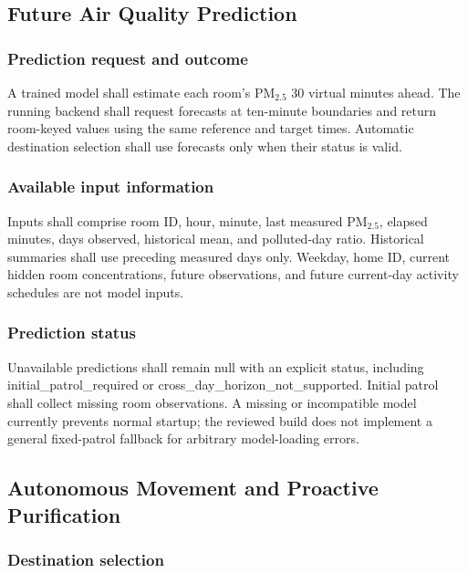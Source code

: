 \documentclass[conference]{IEEEtran}
\newcommand{\pmfine}{\ensuremath{\mathrm{PM}_{2.5}}}
\begin{document}
\subsection{Future Air Quality Prediction}

\subsubsection{Prediction request and outcome}

A trained model shall estimate each room's \pmfine{} 30 virtual minutes ahead. The running backend shall request forecasts at ten-minute boundaries and return room-keyed values using the same reference and target times. Automatic destination selection shall use forecasts only when their status is valid.

\subsubsection{Available input information}

Inputs shall comprise room ID, hour, minute, last measured \pmfine{}, elapsed minutes, days observed, historical mean, and polluted-day ratio. Historical summaries shall use preceding measured days only. Weekday, home ID, current hidden room concentrations, future observations, and future current-day activity schedules are not model inputs.

\subsubsection{Prediction status}

Unavailable predictions shall remain null with an explicit status, including initial\_\allowbreak{}patrol\_\allowbreak{}required or cross\_\allowbreak{}day\_\allowbreak{}horizon\_\allowbreak{}not\_\allowbreak{}supported. Initial patrol shall collect missing room observations. A missing or incompatible model currently prevents normal startup; the reviewed build does not implement a general fixed-patrol fallback for arbitrary model-loading errors.

\subsection{Autonomous Movement and Proactive Purification}

\subsubsection{Destination selection}
\end{document}
